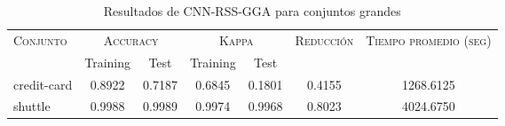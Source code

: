 \begin{table}[]
\centering
\begin{tabular}{l c c c c c c}
\hline
\multirow{2}{*}{\textsc{Conjunto}}
	& \multicolumn{2}{c}{\textsc{Accuracy}}
	& \multicolumn{2}{c}{\textsc{Kappa}}
	& \textsc{Reducción}
	& \textsc{Tiempo promedio (seg)} \\
	& Training & Test
	& Training & Test \\ 
\hline
\hline

credit-card & 0.8922 & 0.7187 & 0.6845 & 0.1801 & 0.4155 & 1268.6125 \\
shuttle & 0.9988 & 0.9989 & 0.9974 & 0.9968 & 0.8023 & 4024.6750 \\

\hline
\end{tabular}
\caption{Resultados de CNN-RSS-GGA para conjuntos grandes }
\label{res-grande-cnn-rss-gga}
\end{table}

